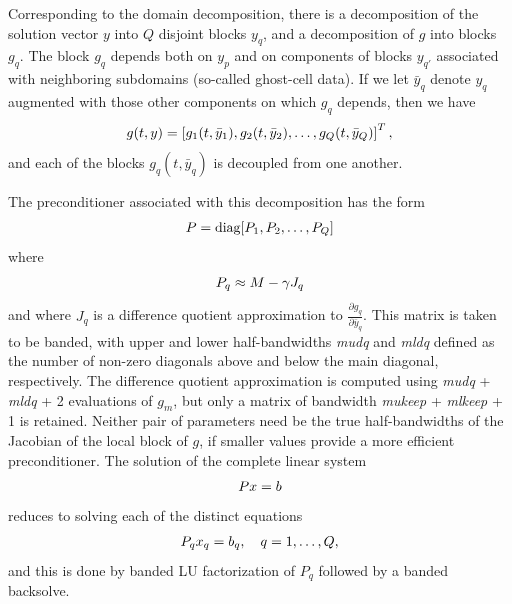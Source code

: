 \documentclass[letterpaper,10pt,english]{sphinxmanual}
\begin{document}
Corresponding to the domain decomposition, there is a decomposition of
the solution vector \(y\) into \(Q\) disjoint blocks
\(y_q\), and a decomposition of \(g\) into blocks
\(g_q\). The block \(g_q\) depends both on \(y_p\) and on
components of blocks \(y_{q'}\) associated with neighboring
subdomains (so-called ghost-cell data).  If we let \(\bar{y}_q\)
denote \(y_q\) augmented with those other components on which
\(g_q\) depends, then we have
\begin{gather}
\begin{split}g(t,y) = \left[ g_1(t,\bar{y}_1), g_2(t,\bar{y}_2), \ldots , g_Q(t,\bar{y}_Q) \right]^T,\end{split}\notag
\end{gather}
and each of the blocks \(g_q(t,\bar{y}_q)\) is decoupled from one another.

The preconditioner associated with this decomposition has the form
\begin{gather}
\begin{split}P = \text{diag}[P_1, P_2, \ldots, P_Q]\end{split}\notag
\end{gather}
where
\begin{gather}
\begin{split}P_q \approx M - \gamma J_q\end{split}\notag
\end{gather}
and where \(J_q\) is a difference quotient approximation to
\(\frac{\partial g_q}{\partial \bar{y}_q}\).  This matrix is taken
to be banded, with upper and lower half-bandwidths \emph{mudq} and
\emph{mldq} defined as the number of non-zero diagonals above and below
the main diagonal, respectively.  The difference quotient
approximation is computed using \emph{mudq} + \emph{mldq} + 2 evaluations of
\(g_m\), but only a matrix of bandwidth \emph{mukeep} + \emph{mlkeep} + 1 is
retained. Neither pair of parameters need be the true half-bandwidths
of the Jacobian of the local block of \(g\), if smaller values
provide a more efficient preconditioner. The solution of the complete
linear system
\begin{gather}
\begin{split}Px = b\end{split}\notag
\end{gather}
reduces to solving each of the distinct equations
\begin{gather}
\begin{split}P_q x_q = b_q, \quad q=1,\ldots,Q,\end{split}\notag
\end{gather}
and this is done by banded LU factorization of \(P_q\) followed by
a banded backsolve.
\end{document}
